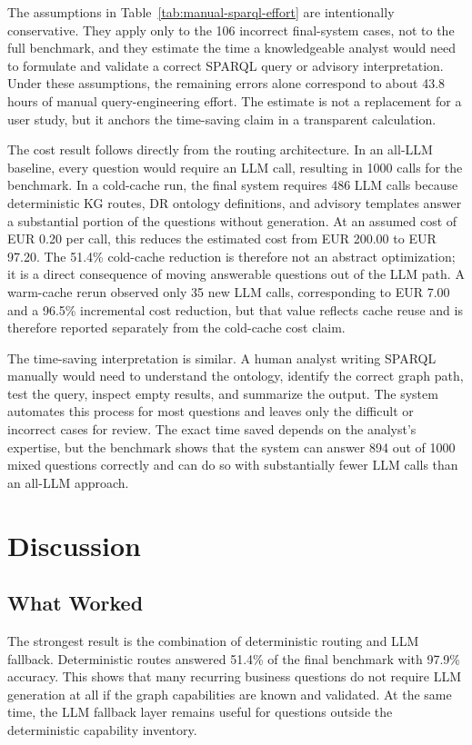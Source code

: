 \documentclass[
  12pt,
  english,
  oneside]{report}
\begin{document}
The assumptions in Table~\ref{tab:manual-sparql-effort} are intentionally conservative. They apply only to the 106 incorrect final-system cases, not to the full benchmark, and they estimate the time a knowledgeable analyst would need to formulate and validate a correct SPARQL query or advisory interpretation. Under these assumptions, the remaining errors alone correspond to about 43.8 hours of manual query-engineering effort. The estimate is not a replacement for a user study, but it anchors the time-saving claim in a transparent calculation.

The cost result follows directly from the routing architecture. In an all-LLM baseline, every question would require an LLM call, resulting in 1000 calls for the benchmark. In a cold-cache run, the final system requires 486 LLM calls because deterministic KG routes, DR ontology definitions, and advisory templates answer a substantial portion of the questions without generation. At an assumed cost of EUR 0.20 per call, this reduces the estimated cost from EUR 200.00 to EUR 97.20. The 51.4\% cold-cache reduction is therefore not an abstract optimization; it is a direct consequence of moving answerable questions out of the LLM path. A warm-cache rerun observed only 35 new LLM calls, corresponding to EUR 7.00 and a 96.5\% incremental cost reduction, but that value reflects cache reuse and is therefore reported separately from the cold-cache cost claim.

The time-saving interpretation is similar. A human analyst writing SPARQL manually would need to understand the ontology, identify the correct graph path, test the query, inspect empty results, and summarize the output. The system automates this process for most questions and leaves only the difficult or incorrect cases for review. The exact time saved depends on the analyst's expertise, but the benchmark shows that the system can answer 894 out of 1000 mixed questions correctly and can do so with substantially fewer LLM calls than an all-LLM approach.


\chapter{Discussion}
\label{chap:discussion}

\section{What Worked}
\label{sec:what-worked}

The strongest result is the combination of deterministic routing and LLM fallback. Deterministic routes answered 51.4\% of the final benchmark with 97.9\% accuracy. This shows that many recurring business questions do not require LLM generation at all if the graph capabilities are known and validated. At the same time, the LLM fallback layer remains useful for questions outside the deterministic capability inventory.
\end{document}
